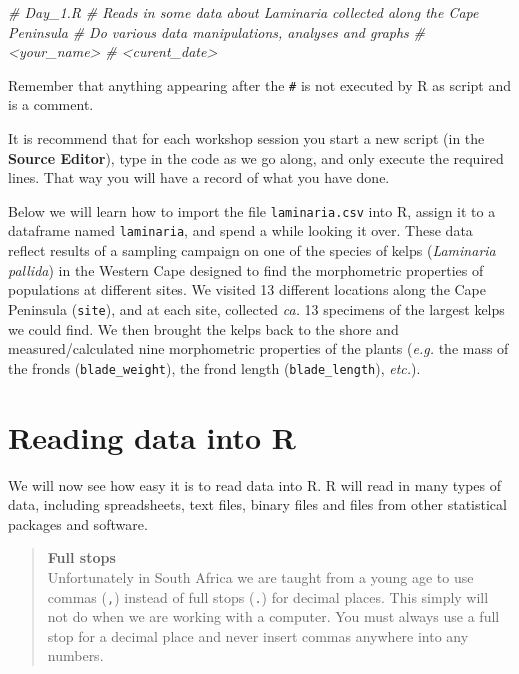 \documentclass[
]{book}
\newenvironment{Shaded}{\begin{snugshade}}{\end{snugshade}}
\newcommand{\CommentTok}[1]{\textcolor[rgb]{0.56,0.35,0.01}{\textit{#1}}}
\begin{document}
\begin{Shaded}
\begin{Highlighting}[]
\CommentTok{\# Day\_1.R}
\CommentTok{\# Reads in some data about Laminaria collected along the Cape Peninsula}
\CommentTok{\# Do various data manipulations, analyses and graphs}
\CommentTok{\# \textless{}your\_name\textgreater{}}
\CommentTok{\# \textless{}curent\_date\textgreater{}}
\end{Highlighting}
\end{Shaded}

Remember that anything appearing after the \texttt{\#} is not executed by R as script and is a comment.

It is recommend that for each workshop session you start a new script (in the \textbf{Source Editor}), type in the code as we go along, and only execute the required lines. That way you will have a record of what you have done.

Below we will learn how to import the file \texttt{laminaria.csv} into R, assign it to a dataframe named \texttt{laminaria}, and spend a while looking it over. These data reflect results of a sampling campaign on one of the species of kelps (\emph{Laminaria pallida}) in the Western Cape designed to find the morphometric properties of populations at different sites. We visited 13 different locations along the Cape Peninsula (\texttt{site}), and at each site, collected \emph{ca.} 13 specimens of the largest kelps we could find. We then brought the kelps back to the shore and measured/calculated nine morphometric properties of the plants (\emph{e.g.} the mass of the fronds (\texttt{blade\_weight}), the frond length (\texttt{blade\_length}), \emph{etc.}).

\hypertarget{reading-data-into-r}{%
\section{Reading data into R}\label{reading-data-into-r}}

We will now see how easy it is to read data into R. R will read in many types of data, including spreadsheets, text files, binary files and files from other statistical packages and software.

\begin{quote}
\textbf{Full stops}\\
Unfortunately in South Africa we are taught from a young age to use commas (\texttt{,}) instead of full stops (\texttt{.}) for decimal places. This simply will not do when we are working with a computer. You must always use a full stop for a decimal place and never insert commas anywhere into any numbers.
\end{quote}
\end{document}
